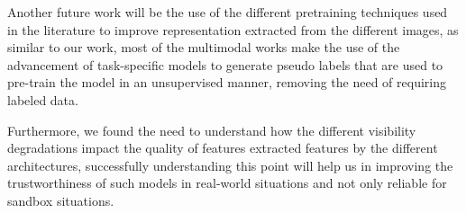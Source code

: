 Another future work will be the use of the different pretraining techniques used in the literature to improve representation extracted from the different images, as similar to our work, most of the multimodal works make the use of the advancement of task-specific models to generate pseudo labels that are used to pre-train the model in an unsupervised manner, removing the need of requiring labeled data.

Furthermore, we found the need to understand how the different visibility degradations impact the quality of features extracted features by the different architectures, successfully understanding this point will help us in improving the trustworthiness of such models in real-world situations and not only reliable for sandbox situations.



